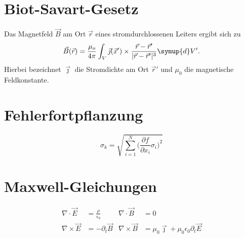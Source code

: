 \documentclass{scrartcl}
\newcommand{\be}{\begin{equation}} %
\newcommand{\ee}{\end{equation}} %
\begin{document}
\section{Biot-Savart-Gesetz}
Das Magnetfeld $\vec{B}$ am Ort $\vec{r}$
eines stromdurchlossenen Leiters ergibt sich zu
 \be
    \vec{B}
    (\vec{r})
    =
    \frac{\mu_o}{4\pi}
    \int_V
    \vec{\jmath}
    (\vec{x}')
    \times \frac{\vec{r}-\vec{r}'}
    {\lvert\vec{r}-\vec{r}'\rvert^3} \symup{d}V'. %
      \ee
  Hierbei bezeichnet $\vec{\jmath}$ die Stromdichte am Ort $\vec{r}'$
  und ${\mu_0}$ die magnetische Feldkonstante.

  \section{Fehlerfortpflanzung}
  \begin{equation}
    \sigma_k =
    \sqrt{\sum_{i=1}^N
    \Biggl(\frac{\partial f}{\partial{x_i}} \sigma_i \Biggr)^2}
  \end{equation}
  \section{Maxwell-Gleichungen}

  \begin{align}
    \nabla\cdot\vec{E} &= \frac{\rho}{\epsilon_0}  &  \nabla\cdot\vec{B} &= 0 \\
    \nabla\times\vec{E} &= -\partial_t\vec{B} & \nabla\times\vec{B} &= \mu_0\vec{\jmath}
    +\mu_0\epsilon_0\partial_t\vec{E}
\end{align}
\end{document}
